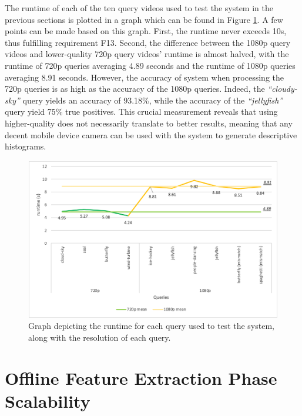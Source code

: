 The runtime of each of the ten query videos used to test the system in the previous sections is plotted in a graph which can be found in Figure \ref{fig:evaluation-runtime_plot}. A few points can be made based on this graph. First, the runtime never exceeds 10s, thus fulfilling requirement F13. Second, the difference between the 1080p query videos and lower-quality 720p query videos' runtime is almost halved, with the runtime of 720p queries averaging 4.89 seconds and the runtime of 1080p queries averaging 8.91 seconds. However, the accuracy of system when processing the 720p queries is as high as the accuracy of the 1080p queries. Indeed, the \textit{``cloudy-sky''} query yields an accuracy of 93.18\%, while the accuracy of the \textit{``jellyfish''} query yield 75\% true positives. This crucial measurement reveals that using higher-quality does not necessarily translate to better results, meaning that any decent mobile device camera can be used with the system to generate descriptive histograms.

\begin{figure}[h] 
\centerline{\includegraphics[width=\textwidth]{figures/evaluation/runtime_plot.png}}
\caption{\label{fig:evaluation-runtime_plot}Graph depicting the runtime for each query used to test the system, along with the resolution of each query.}
\end{figure}


\section{Offline Feature Extraction Phase Scalability}

